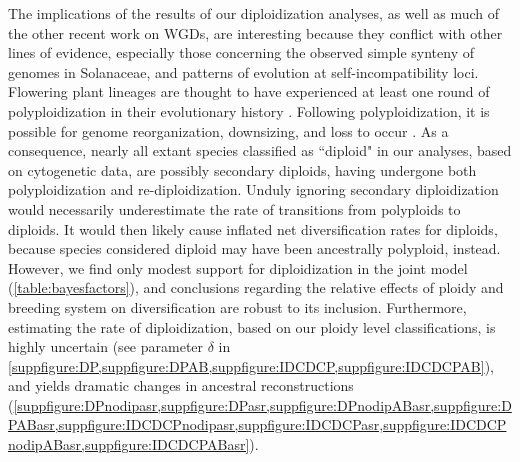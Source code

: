 The implications of the results of our diploidization analyses, as well as much of the other recent work on WGDs, are interesting because they conflict with other lines of evidence, especially those concerning the observed simple synteny of genomes in Solanaceae, and patterns of evolution at self-incompatibility loci.
Flowering plant lineages are thought to have experienced at least one round of polyploidization in their evolutionary history \citep{soltis_2015}. 
Following polyploidization, it is possible for genome reorganization, downsizing, and loss to occur \citep{dodsworth_2015, zenil_2016, mandakova_2018}. %
As a consequence, nearly all extant species classified as ``diploid" in our analyses, based on cytogenetic data, are possibly secondary diploids, having undergone both polyploidization and re-diploidization.
Unduly ignoring secondary diploidization would necessarily underestimate the rate of transitions from polyploids to diploids.
It would then likely cause inflated net diversification rates for diploids, because species considered diploid may have been ancestrally polyploid, instead. %
However, we find only modest support for diploidization in the joint model  (\cref{table:bayesfactors}), and conclusions regarding the relative effects of ploidy and breeding system on diversification are robust to its inclusion.
Furthermore, estimating the rate of diploidization, based on our ploidy level classifications, is highly uncertain (see parameter $\delta$ in \cref{suppfigure:DP,suppfigure:DPAB,suppfigure:IDCDCP,suppfigure:IDCDCPAB}), and yields dramatic changes in ancestral reconstructions (\cref{suppfigure:DPnodipasr,suppfigure:DPasr,suppfigure:DPnodipABasr,suppfigure:DPABasr,suppfigure:IDCDCPnodipasr,suppfigure:IDCDCPasr,suppfigure:IDCDCPnodipABasr,suppfigure:IDCDCPABasr}).


